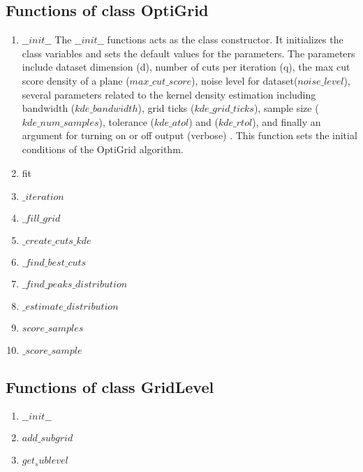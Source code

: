 \subsection{Functions of class OptiGrid}
\begin{enumerate}    
    \item $\_\_init\_\_$\newline
    {The $\_\_init\_\_$ functions acts as the class constructor. It initializes the class variables and sets the default values for the parameters. 
    The parameters include dataset dimension (d), number of cuts per iteration (q), the max cut score density of a plane ($max\_cut\_score$), noise level for dataset($noise\_level$), several parameters related to the kernel density estimation including bandwidth ($kde\_bandwidth$), grid ticks ($kde\_grid\_ticks$), sample size ($kde\_num\_samples$), tolerance ($kde\_atol$) and ($kde\_rtol$), and finally an argument for turning on or off output (verbose) . This function sets the initial conditions of the OptiGrid algorithm.}
    \item fit
    \item $\_iteration$
    \item $\_fill\_grid$
    \item $\_create\_cuts\_kde$
    \item $\_find\_best\_cuts$
    \item $\_find\_peaks\_distribution$
    \item $\_estimate\_distribution$
    \item $score\_samples$
    \item $\_score\_sample $
\end{enumerate}

\subsection{Functions of class GridLevel}
\begin{enumerate}    
    \item $\_\_init\_\_$
    \item $add\_subgrid$
    \item $get_sublevel$
\end{enumerate}


